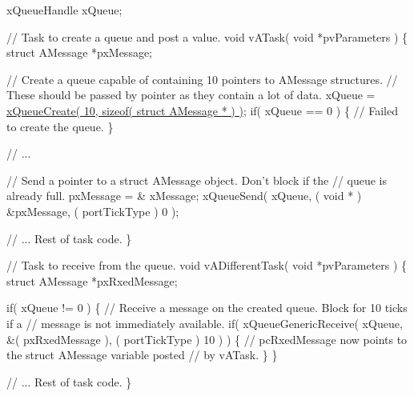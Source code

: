 \begin{DoxyPre}xQueueHandle xQueue;\end{DoxyPre}



\begin{DoxyPre}// Task to create a queue and post a value.
void vATask( void *pvParameters )
\{
struct AMessage *pxMessage;\end{DoxyPre}



\begin{DoxyPre}   // Create a queue capable of containing 10 pointers to AMessage structures.
   // These should be passed by pointer as they contain a lot of data.
   xQueue = \hyperlink{queue_8h_aeb858b824bd74a934ea7ebb81af2a6bb}{xQueueCreate( 10, sizeof( struct AMessage * ) )};
   if( xQueue == 0 )
   \{
    // Failed to create the queue.
   \}\end{DoxyPre}



\begin{DoxyPre}   // ...\end{DoxyPre}



\begin{DoxyPre}   // Send a pointer to a struct AMessage object.  Don't block if the
   // queue is already full.
   pxMessage = \& xMessage;
   xQueueSend( xQueue, ( void * ) \&pxMessage, ( portTickType ) 0 );\end{DoxyPre}



\begin{DoxyPre}   // ... Rest of task code.
\}\end{DoxyPre}



\begin{DoxyPre}// Task to receive from the queue.
void vADifferentTask( void *pvParameters )
\{
struct AMessage *pxRxedMessage;\end{DoxyPre}



\begin{DoxyPre}   if( xQueue != 0 )
   \{
    // Receive a message on the created queue.  Block for 10 ticks if a
    // message is not immediately available.
    if( xQueueGenericReceive( xQueue, \&( pxRxedMessage ), ( portTickType ) 10 ) )
    \{
        // pcRxedMessage now points to the struct AMessage variable posted
        // by vATask.
    \}
   \}\end{DoxyPre}



\begin{DoxyPre}   // ... Rest of task code.
\}
\end{DoxyPre}
 